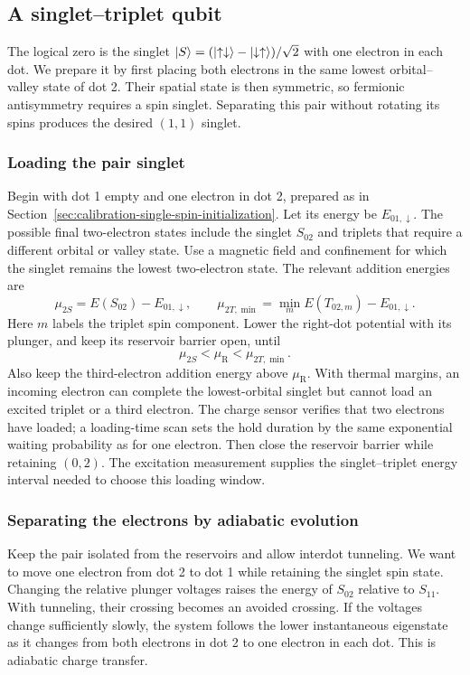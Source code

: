 \subsection{A singlet--triplet qubit}
\label{sec:calibration-st-initialization}

The logical zero is the singlet
$\lvert S\rangle=(\lvert \uparrow\downarrow\rangle-\lvert \downarrow\uparrow\rangle)/\sqrt2$
with one electron in each dot. We prepare it by first placing both
electrons in the same lowest orbital--valley state of dot 2.
Their spatial state is then symmetric, so fermionic antisymmetry
requires a spin singlet. Separating this pair without rotating its
spins produces the desired $(1,1)$ singlet.

\subsubsection{Loading the pair singlet}
Begin with dot 1 empty and one electron in dot 2, prepared as in
Section~\ref{sec:calibration-single-spin-initialization}. Let its
energy be $E_{01,\downarrow}$. The possible final two-electron
states include the singlet $S_{02}$ and triplets that require a
different orbital or valley state. Use a magnetic field and
confinement for which the singlet remains the lowest
two-electron state. The relevant addition energies are
\[
 \mu_{2S}=E(S_{02})-E_{01,\downarrow},\qquad
 \mu_{2T,\min}=\min_m E(T_{02,m})-E_{01,\downarrow}.
\]
Here $m$ labels the triplet spin component. Lower the right-dot
potential with its plunger, and keep its reservoir barrier open,
until
\[
 \mu_{2S}<\mu_{\mathrm R}<\mu_{2T,\min}.
\]
Also keep the third-electron addition energy above
$\mu_{\mathrm R}$. With thermal margins, an incoming electron can
complete the lowest-orbital singlet but cannot load an excited
triplet or a third electron. The charge sensor verifies that two
electrons have loaded; a loading-time scan sets the hold duration
by the same exponential waiting probability as for one electron.
Then close the reservoir barrier while retaining $(0,2)$.
The excitation measurement supplies the singlet--triplet energy
interval needed to choose this loading window.

\subsubsection{Separating the electrons by adiabatic evolution}
Keep the pair isolated from the reservoirs and allow interdot
tunneling. We want to move one electron from dot 2 to dot 1 while
retaining the singlet spin state. Changing the relative plunger
voltages raises the energy of $S_{02}$ relative to $S_{11}$.
With tunneling, their crossing becomes an avoided crossing.
If the voltages change sufficiently slowly, the system follows
the lower instantaneous eigenstate as it changes from both electrons
in dot 2 to one electron in each dot. This is adiabatic charge transfer.

